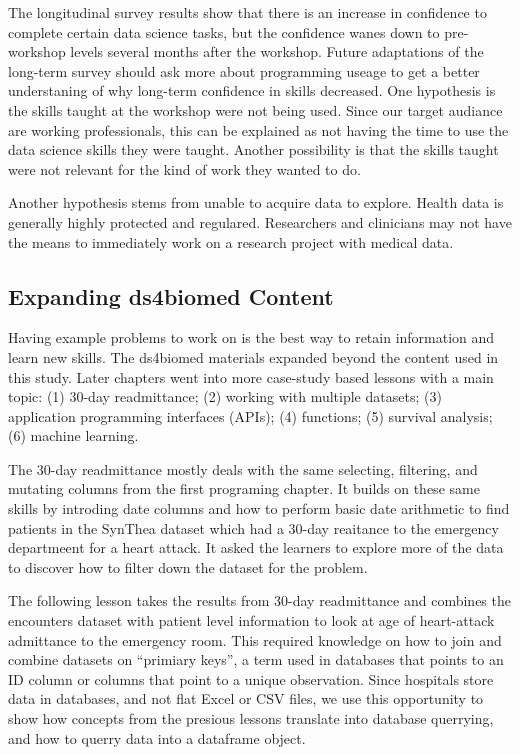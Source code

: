 \documentclass[030-workshop.tex]{subfiles}
\begin{document}
        The longitudinal survey results show that there is an increase in confidence to complete certain data science tasks,
        but the confidence wanes down to pre-workshop levels several months after the workshop.
        Future adaptations of the long-term survey should ask more about programming useage to get a better understaning
        of why long-term confidence in skills decreased.
        One hypothesis is the skills taught at the workshop were not being used.
        Since our target audiance are working professionals,
        this can be explained as not having the time to use the data science skills they were taught.
        Another possibility is that the skills taught were not relevant for the kind of work they wanted to do.

        Another hypothesis stems from unable to acquire data to explore.
        Health data is generally highly protected and regulared.
        Researchers and clinicians may not have the means to immediately work on a research project with medical data.

        \subsection{Expanding ds4biomed Content}

            Having example problems to work on is the best way to retain information and learn new skills.
            The ds4biomed materials expanded beyond the content used in this study.
            Later chapters went into more case-study based lessons with a main topic:
            (1) 30-day readmittance;
            (2) working with multiple datasets;
            (3) application programming interfaces (APIs);
            (4) functions;
            (5) survival analysis;
            (6) machine learning.

            The 30-day readmittance mostly deals with the same selecting, filtering, and mutating columns
            from the first programing chapter.
            It builds on these same skills by introding date columns and how to perform basic date arithmetic
            to find patients in the SynThea dataset which had a 30-day reaitance to the emergency departmeent for a heart attack.
            It asked the learners to explore more of the data to discover how to filter down the dataset for the problem.

            The following lesson takes the results from 30-day readmittance and combines the encounters dataset with
            patient level information to look at age of heart-attack admittance to the emergency room.
            This required knowledge on how to join and combine datasets on ``primiary keys'',
            a term used in databases that points to an ID column or columns that point to a unique observation.
            Since hospitals store data in databases, and not flat Excel or CSV files,
            we use this opportunity to show how concepts from the presious lessons translate into database querrying,
            and how to querry data into a dataframe object.
\end{document}
